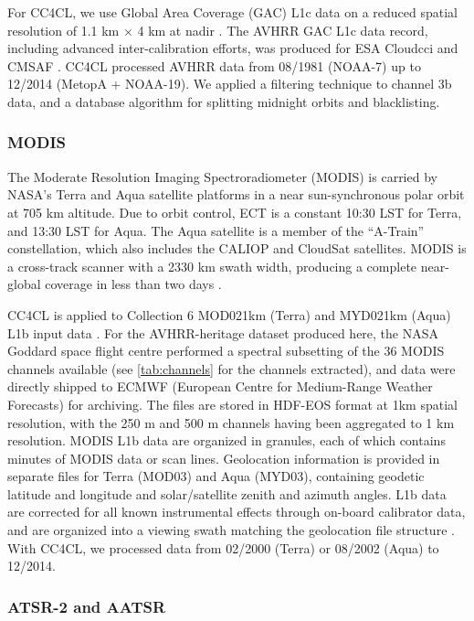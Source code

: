 For CC4CL, we use Global Area Coverage (GAC) L1c data on a reduced spatial resolution of 1.1 km $\times$ 4 km at nadir \citep{Devasthale16}. The AVHRR GAC L1c data record, including advanced inter-calibration efforts, was produced for ESA Cloud\textunderscore cci and CMSAF \citep{Schulz09,Karlsson13}. CC4CL processed AVHRR data from 08/1981 (NOAA-7) up to 12/2014 (MetopA + NOAA-19). We applied a filtering technique to channel 3b data, and a database algorithm for splitting midnight orbits and blacklisting. 

\subsubsection{MODIS}

The Moderate Resolution Imaging Spectroradiometer (MODIS) is carried by NASA's Terra and Aqua satellite platforms in a near sun-synchronous polar orbit at 705 km altitude. Due to orbit control, ECT is a constant 10:30 LST for Terra, and 13:30 LST for Aqua. The Aqua satellite is a member of the ``A-Train'' constellation, which also includes the CALIOP and CloudSat satellites. MODIS is a cross-track scanner with a 2330 km swath width, producing a complete near-global coverage in less than two days \citep{Xiong09}.

CC4CL is applied to Collection 6 MOD021km (Terra) and MYD021km (Aqua) L1b input data \citep{MODIS_L1B}. For the AVHRR-heritage dataset produced here, the NASA Goddard space flight centre performed a spectral subsetting of the 36 MODIS channels available (see \autoref{tab:channels} for the channels extracted), and data were directly shipped to ECMWF (European Centre for Medium-Range Weather Forecasts) for archiving. The files are stored in HDF-EOS format at 1km spatial resolution, with the 250 m and 500 m channels having been aggregated to 1 km resolution. MODIS L1b data are organized in granules, each of which contains  minutes of MODIS data or  scan lines. Geolocation information is provided in separate files for Terra (MOD03) and Aqua (MYD03), containing geodetic latitude and longitude and solar/satellite zenith and azimuth angles. L1b data are corrected for all known instrumental effects through on-board calibrator data, and are organized into a viewing swath matching the geolocation file structure \citep{MODIS_PUG}. With CC4CL, we processed data from 02/2000 (Terra) or 08/2002 (Aqua) to 12/2014. 

\subsubsection{ATSR-2 and AATSR}

